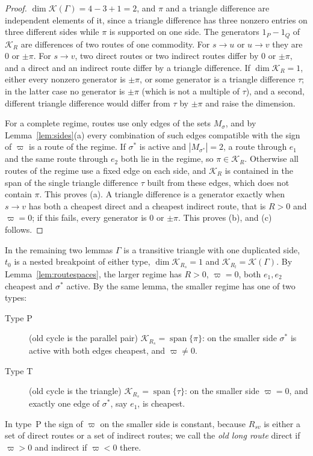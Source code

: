 \begin{proof}
$\dim\mathcal K(\Gamma)=4-3+1=2$, and $\pi$ and a triangle difference are
independent elements of it, since a triangle difference has three nonzero
entries on three different sides while $\pi$ is supported on one side.
The generators $1_P-1_Q$ of $\mathcal K_R$ are differences of two routes of
one commodity. For $s\to u$ or $u\to v$ they are $0$ or $\pm\pi$. For
$s\to v$, two direct routes or two indirect routes differ by $0$ or $\pm\pi$,
and a direct and an indirect route differ by a triangle difference. If
$\dim\mathcal K_R=1$, either every nonzero generator is $\pm\pi$, or some
generator is a triangle difference $\tau$; in the latter case no generator is
$\pm\pi$ (which is not a multiple of $\tau$), and a second, different
triangle difference would differ from $\tau$ by $\pm\pi$ and raise the
dimension.

For a complete regime, routes use only edges of the sets $M_\sigma$, and by
Lemma~\ref{lem:sides}(a) every combination of such edges compatible with
the sign of $\varpi$ is a route of the regime. If $\sigma^*$ is active and
$|M_{\sigma^*}|=2$, a route through $e_1$ and the same route through $e_2$
both lie in the regime, so $\pi\in\mathcal K_R$. Otherwise all routes of the
regime use a fixed edge on each side, and $\mathcal K_R$ is contained in the
span of the single triangle difference $\tau$ built from these edges, which
does not contain $\pi$. This proves (a). A triangle difference is a
generator exactly when $s\to v$ has both a cheapest direct and a cheapest
indirect route, that is $R>0$ and $\varpi=0$; if this fails, every generator
is $0$ or $\pm\pi$. This proves (b), and (c) follows.
\end{proof}

In the remaining two lemmas $\Gamma$ is a transitive triangle with one
duplicated side, $t_0$ is a nested breakpoint of either type,
$\dim\mathcal K_{R_s}=1$ and $\mathcal K_{R_l}=\mathcal K(\Gamma)$. By
Lemma~\ref{lem:routespaces}, the larger regime has $R>0$, $\varpi=0$, both
$e_1,e_2$ cheapest and $\sigma^*$ active. By the same lemma, the smaller
regime has one of two types:
\begin{description}
\item[Type P] (old cycle is the parallel pair) $\mathcal K_{R_s}=
 \operatorname{span}\{\pi\}$: on the smaller side $\sigma^*$ is active with
 both edges cheapest, and $\varpi\ne0$.
\item[Type T] (old cycle is the triangle) $\mathcal K_{R_s}=
 \operatorname{span}\{\tau\}$: on the smaller side $\varpi=0$, and exactly one
 edge of $\sigma^*$, say $e_1$, is cheapest.
\end{description}
In type~P the sign of $\varpi$ on the smaller side is constant, because
$R_{sv}$ is either a set of direct routes or a set of indirect routes; we
call the \emph{old long route} direct if $\varpi>0$ and indirect if
$\varpi<0$ there.

